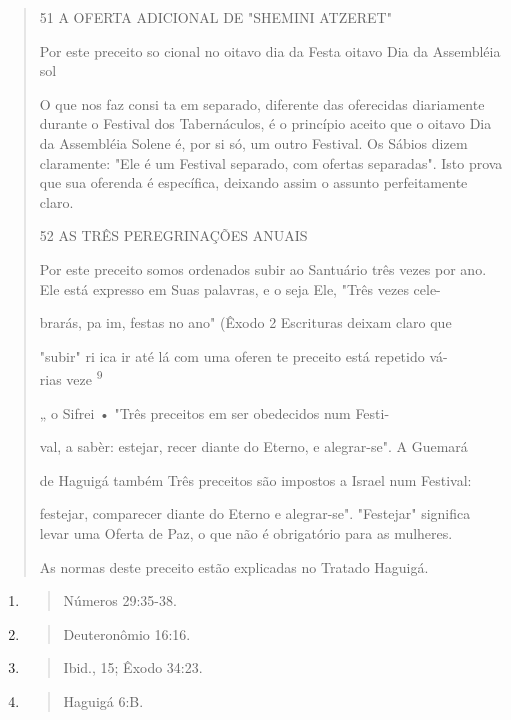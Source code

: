 \begin{quote}
51 A OFERTA ADICIONAL DE "SHEMINI ATZERET"

Por este preceito so cional no oitavo dia da Festa oitavo Dia da
Assembléia sol

O que nos faz consi ta em separado, diferente das oferecidas diariamente
durante o Festival dos Ta­bernáculos, é o princípio aceito que o oitavo
Dia da Assembléia Solene é, por si só, um outro Festival. Os Sábios
dizem claramente: "Ele é um Festival separa­do, com ofertas separadas".
Isto prova que sua oferenda é específica, deixando assim o assunto
perfeitamente claro.

52 AS TRÊS PEREGRINAÇÕES ANUAIS

Por este preceito somos ordenados subir ao Santuário três vezes por ano.
Ele está expresso em Suas palavras, e o seja Ele, "Três vezes cele-

brarás, pa im, festas no ano" (Êxodo 2 Escrituras deixam claro que

"subir" ri ica ir até lá com uma oferen te preceito está repetido vá-\\
rias veze \textsuperscript{9}

„ o Sifrei • "Três preceitos em ser obedecidos num Festi-

val, a sabèr: estejar, recer diante do Eterno, e alegrar-se". A Guemará

de Haguigá também Três preceitos são impostos a Israel num Festival:

festejar, comparecer diante do Eterno e alegrar-se". "Festejar"
significa levar uma Oferta de Paz, o que não é obrigatório para as
mulheres.

As normas deste preceito estão explicadas no Tratado Haguigá.
\end{quote}

\begin{enumerate}
\def\labelenumi{\arabic{enumi}.}
\setcounter{enumi}{66}
\item
  \begin{quote}
  Números 29:35-38.
  \end{quote}
\item
  \begin{quote}
  Deuteronômio 16:16.
  \end{quote}
\item
  \begin{quote}
  Ibid., 15; Êxodo 34:23.
  \end{quote}
\item
  \begin{quote}
  Haguigá 6:B.
  \end{quote}
\end{enumerate}

